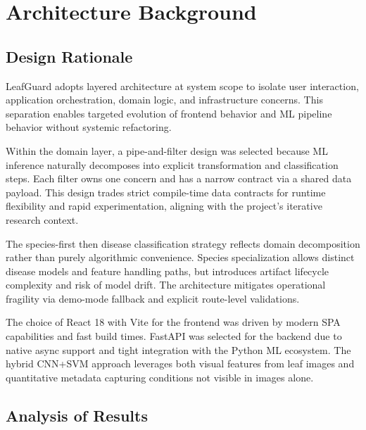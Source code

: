 \documentclass[11pt,a4paper,oneside]{report}
\begin{document}
\chapter{Architecture Background}

\section{Design Rationale}

LeafGuard adopts layered architecture at system scope to isolate user interaction, application orchestration, domain logic, and infrastructure concerns. This separation enables targeted evolution of frontend behavior and ML pipeline behavior without systemic refactoring.

Within the domain layer, a pipe-and-filter design was selected because ML inference naturally decomposes into explicit transformation and classification steps. Each filter owns one concern and has a narrow contract via a shared data payload. This design trades strict compile-time data contracts for runtime flexibility and rapid experimentation, aligning with the project's iterative research context.

The species-first then disease classification strategy reflects domain decomposition rather than purely algorithmic convenience. Species specialization allows distinct disease models and feature handling paths, but introduces artifact lifecycle complexity and risk of model drift. The architecture mitigates operational fragility via demo-mode fallback and explicit route-level validations.

The choice of React 18 with Vite for the frontend was driven by modern SPA capabilities and fast build times. FastAPI was selected for the backend due to native async support and tight integration with the Python ML ecosystem. The hybrid CNN+SVM approach leverages both visual features from leaf images and quantitative metadata capturing conditions not visible in images alone.

\section{Analysis of Results}
\end{document}
